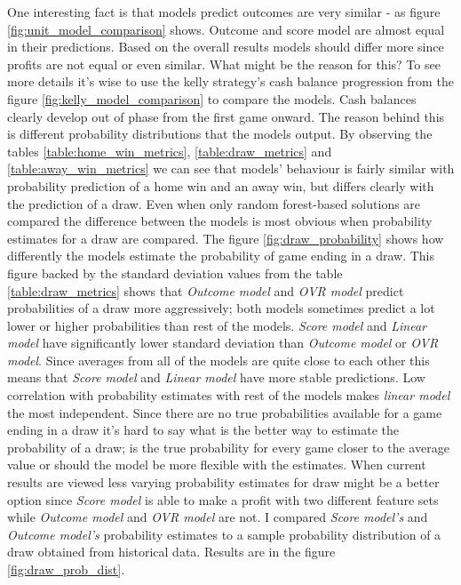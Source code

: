 One interesting fact is that models predict outcomes are very similar - as figure \ref{fig:unit_model_comparison} shows. Outcome and score model are almost equal in their predictions. Based on the overall results models should differ more since profits are not equal or even similar. What might be the reason for this? To see more details it's wise to use the kelly strategy's cash balance progression from the figure \ref{fig:kelly_model_comparison} to compare the models. Cash balances clearly develop out of phase from the first game onward. The reason behind this is different probability distributions that the models output. By observing the tables \ref{table:home_win_metrics}, \ref{table:draw_metrics} and \ref{table:away_win_metrics} we can see that models' behaviour is fairly similar with probability prediction of a home win and an away win, but differs clearly with the prediction of a draw. Even when only random forest-based solutions are compared the difference between the models is most obvious when probability estimates for a draw are compared. The figure \ref{fig:draw_probability} shows how differently the models estimate the probability of game ending in a draw. This figure backed by the standard deviation values from the table \ref{table:draw_metrics} shows that \textit{Outcome model} and \textit{OVR model} predict probabilities of a draw more aggressively; both models sometimes predict a lot lower or higher probabilities than rest of the models. \textit{Score model} and \textit{Linear model} have significantly lower standard deviation than \textit{Outcome model} or \textit{OVR model}. Since averages from all of the models are quite close to each other this means that \textit{Score model} and \textit{Linear model} have more stable predictions. Low correlation with probability estimates with rest of the models makes \textit{linear model} the most independent. Since there are no true probabilities available for a game ending in a draw it's hard to say what is the better way to estimate the probability of a draw; is the true probability for every game closer to the average value or should the model be more flexible with the estimates. When current results are viewed less varying probability estimates for draw might be a better option since \textit{Score model} is able to make a profit with two different feature sets while \textit{Outcome model} and \textit{OVR model} are not. I compared \textit{Score model's} and \textit{Outcome model's} probability estimates to a sample probability distribution of a draw obtained from historical data. Results are in the figure \ref{fig:draw_prob_dist}.

